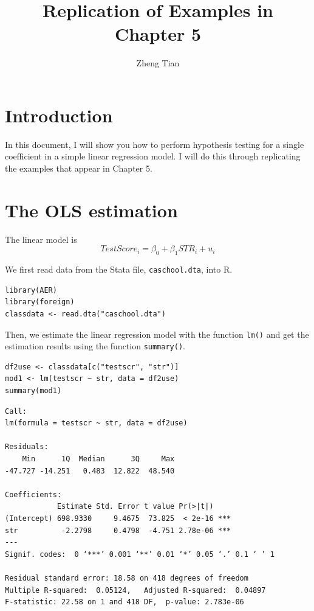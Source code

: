 \documentclass[11pt]{article}
\author{Zheng Tian}
\date{}
\title{Replication of Examples in Chapter 5}
\begin{document}
\maketitle

\section{Introduction}
\label{sec:org88266ff}

In this document, I will show you how to perform hypothesis testing
for a single coefficient in a simple linear regression model. I will
do this through replicating the examples that appear in Chapter 5.


\section{The OLS estimation}
\label{sec:org3578b11}

The linear model is
\begin{equation}
\label{eq:testscr-str-1}
TestScore_i = \beta_0 + \beta_1 STR_i + u_i
\end{equation}

We first read data from the Stata file, \texttt{caschool.dta}, into R.
\begin{verbatim}
library(AER)
library(foreign)
classdata <- read.dta("caschool.dta")
\end{verbatim}

Then, we estimate the linear regression model with the function \texttt{lm()}
and get the estimation results using the function \texttt{summary()}.
\begin{verbatim}
df2use <- classdata[c("testscr", "str")]
mod1 <- lm(testscr ~ str, data = df2use)
summary(mod1)
\end{verbatim}

\begin{verbatim}
Call:
lm(formula = testscr ~ str, data = df2use)

Residuals:
    Min      1Q  Median      3Q     Max
-47.727 -14.251   0.483  12.822  48.540

Coefficients:
            Estimate Std. Error t value Pr(>|t|)
(Intercept) 698.9330     9.4675  73.825  < 2e-16 ***
str          -2.2798     0.4798  -4.751 2.78e-06 ***
---
Signif. codes:  0 ‘***’ 0.001 ‘**’ 0.01 ‘*’ 0.05 ‘.’ 0.1 ‘ ’ 1

Residual standard error: 18.58 on 418 degrees of freedom
Multiple R-squared:  0.05124,	Adjusted R-squared:  0.04897
F-statistic: 22.58 on 1 and 418 DF,  p-value: 2.783e-06
\end{verbatim}
\end{document}
